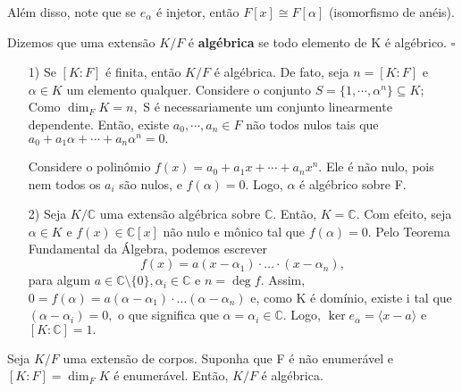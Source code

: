 \documentclass[algebraII_notes.tex]{subfiles}
\begin{document}
Além disso, note que se \(e_{\alpha }\) é injetor, então \(F[x]\cong{F[\alpha ]}\) (isomorfismo de anéis).
\begin{def*}
	Dizemos que uma extensão \(K/F\) é \textbf{algébrica} se todo elemento de K é algébrico. \(\square\)
\end{def*}
\begin{example}
	\begin{itemize}
		\item[1)] Se \([K:F]\) é finita, então \(K/F\) é algébrica. De fato, seja \(n=[K:F]\) e \(\alpha \in K\) um elemento qualquer.
		      Considere o conjunto \(S = \{1, \cdots, \alpha ^{n}\}\subseteq{K};\) Como \(\dim_{F}K = n,\) S é necessariamente um conjunto linearmente
		      dependente. Então, existe \(a_{0}, \cdots, a_{n}\in F\) não todos nulos tais que \(a_{0} + a_{1}\alpha + \cdots + a_{n}\alpha^{n} = 0.\)

		      Considere o polinômio \(f(x) = a_{0}+a_{1}x + \cdots + a_{n}x^{n}.\) Ele é não nulo, pois nem todos os \(a_{i}\) são nulos,
		      e \(f(\alpha ) = 0\). Logo, \(\alpha \) é algébrico sobre F.

		\item[2)] Seja \(K/\mathbb{C}\) uma extensão algébrica sobre \(\mathbb{C}.\) Então, \(K = \mathbb{C}.\) Com efeito, seja \(\alpha \in K\)
		      e \(f(x)\in \mathbb{C}[x]\) não nulo e mônico tal que \(f(\alpha ) = 0\). Pelo Teorema Fundamental da Álgebra, podemos escrever
		      \[
			      f(x) = a(x-\alpha_{1})\cdot \dotsc \cdot (x-\alpha_{n}),
		      \]
		      para algum \(a\in \mathbb{C}\setminus{\{0\}},\alpha_{i}\in \mathbb{C}\) e \(n = \deg{f}.\) Assim, \(0 = f(\alpha ) = a(\alpha -\alpha_{1})\cdot \dotsc(\alpha -\alpha_{n})\)
		      e, como K é domínio, existe i tal que \((\alpha -\alpha_{i})=0,\) o que significa que \(\alpha=\alpha_{i}\in \mathbb{C}.\) Logo, \(\ker{e_{\alpha }}=\langle x-a \rangle\) e \([K:\mathbb{C}] = 1.\)
	\end{itemize}
\end{example}
\begin{prop*}
	Seja \(K/F\) uma extensão de corpos. Suponha que F é não enumerável e \([K:F]=\dim_{F}K\) é enumerável. Então,
	\(K/F\) é algébrica.
\end{prop*}
\end{document}
